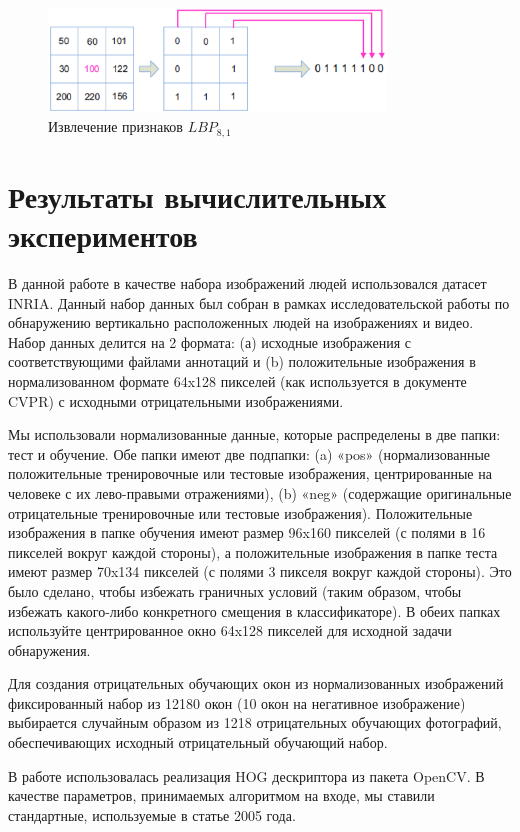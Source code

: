 \documentclass[12pt,twoside]{article}
\begin{document}
\begin{figure}[H]
	\includegraphics[width=0.8\textwidth]{LBP_alg}
	\caption{Извлечение признаков $LBP_{8,1}$\cite{Wang09}}
	\label{fg:LBP_Wang}
\end{figure}


\section{Результаты вычислительных экспериментов}
В данной работе в качестве набора изображений людей использовался датасет INRIA\cite{inria}. Данный набор данных был собран в рамках исследовательской работы по обнаружению вертикально расположенных людей на изображениях и видео\cite{dalaltriggs2005}. Набор данных делится на 2 формата: (а) исходные изображения с соответствующими файлами аннотаций и (b) положительные изображения в нормализованном формате 64x128 пикселей (как используется в документе CVPR) с исходными отрицательными изображениями.

Мы использовали нормализованные данные, которые распределены в две папки: тест и обучение. Обе папки имеют две подпапки: (a) «pos» (нормализованные положительные тренировочные или тестовые изображения, центрированные на человеке с их лево-правыми отражениями), (b) «neg» (содержащие оригинальные отрицательные тренировочные или тестовые изображения). Положительные изображения в папке обучения имеют размер 96x160 пикселей (с полями в 16 пикселей вокруг каждой стороны), а положительные изображения в папке теста имеют размер 70x134 пикселей (с полями 3 пикселя вокруг каждой стороны). Это было сделано, чтобы избежать граничных условий (таким образом, чтобы избежать какого-либо конкретного смещения в классификаторе). В обеих папках используйте центрированное окно 64x128 пикселей для исходной задачи обнаружения.

Для создания отрицательных обучающих окон из нормализованных изображений фиксированный набор из 12180 окон (10 окон на негативное изображение) выбирается случайным образом из 1218 отрицательных обучающих фотографий, обеспечивающих исходный отрицательный обучающий набор.

В работе использовалась реализация HOG дескриптора из пакета OpenCV\cite{opencv}. В качестве параметров, принимаемых алгоритмом на входе, мы ставили стандартные, используемые в статье \cite{dalaltriggs2005} 2005 года.
\end{document}
